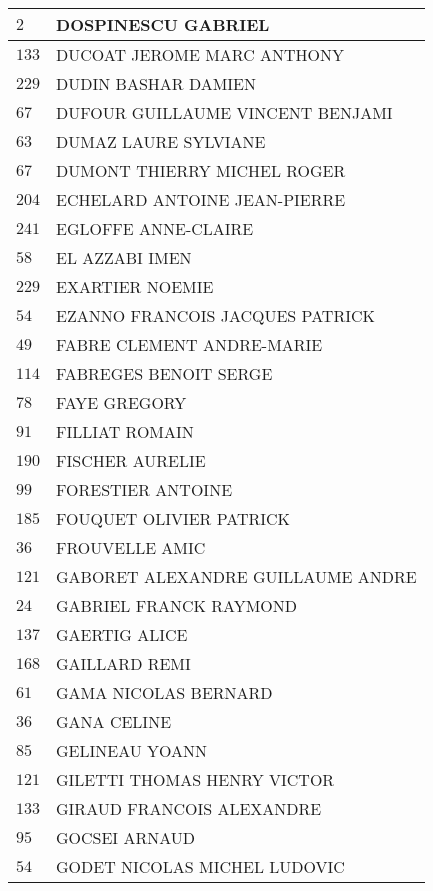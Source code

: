 \begin{xltabular}{\linewidth}{|l|X|}
    \hline
    $2$ & DOSPINESCU GABRIEL \\
    \hline
    $133$ & DUCOAT JEROME MARC ANTHONY \\
    \hline
    $229$ & DUDIN BASHAR DAMIEN \\
    \hline
    $67$ & DUFOUR GUILLAUME VINCENT BENJAMI \\
    \hline
    $63$ & DUMAZ LAURE SYLVIANE \\
    \hline
    $67$ & DUMONT THIERRY MICHEL ROGER \\
    \hline
    $204$ & ECHELARD ANTOINE JEAN-PIERRE \\
    \hline
    $241$ & EGLOFFE ANNE-CLAIRE \\
    \hline
    $58$ & EL AZZABI IMEN \\
    \hline
    $229$ & EXARTIER NOEMIE \\
    \hline
    $54$ & EZANNO FRANCOIS JACQUES PATRICK \\
    \hline
    $49$ & FABRE CLEMENT ANDRE-MARIE \\
    \hline
    $114$ & FABREGES BENOIT SERGE \\
    \hline
    $78$ & FAYE GREGORY \\
    \hline
    $91$ & FILLIAT ROMAIN \\
    \hline
    $190$ & FISCHER AURELIE \\
    \hline
    $99$ & FORESTIER ANTOINE \\
    \hline
    $185$ & FOUQUET OLIVIER PATRICK \\
    \hline
    $36$ & FROUVELLE AMIC \\
    \hline
    $121$ & GABORET ALEXANDRE GUILLAUME ANDRE \\
    \hline
    $24$ & GABRIEL FRANCK RAYMOND \\
    \hline
    $137$ & GAERTIG ALICE \\
    \hline
    $168$ & GAILLARD REMI \\
    \hline
    $61$ & GAMA NICOLAS BERNARD \\
    \hline
    $36$ & GANA CELINE \\
    \hline
    $85$ & GELINEAU YOANN \\
    \hline
    $121$ & GILETTI THOMAS HENRY VICTOR \\
    \hline
    $133$ & GIRAUD FRANCOIS ALEXANDRE \\
    \hline
    $95$ & GOCSEI ARNAUD \\
    \hline
    $54$ & GODET NICOLAS MICHEL LUDOVIC \\

\end{xltabular}
